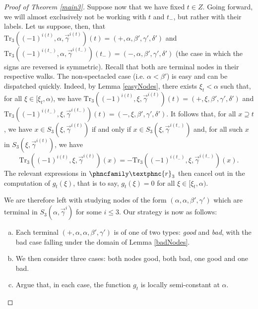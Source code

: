 \documentclass{amsart}
\numberwithin{theorem}{section}
\theoremstyle{definition}
\newcommand{\Tr}{\mathrm{Tr}}
\newcommand{\resh}{{\phncfamily\textphnc{r}}}
\begin{document}
\begin{proof}[Proof of Theorem \ref{main3}]
Suppose now that we have fixed $t\in Z$. Going forward, we will almost exclusively not be working with $t$ and $t_-$, but rather with their labels. Let us suppose, then, that 
$\Tr_3((-1)^{i(t)},\alpha,\vec{\gamma}^{i(t)})(t) = (+,\alpha,\beta',\gamma',\delta')$ and 
$\Tr_3((-1)^{i(t_-)},\alpha,\vec{\gamma}^{i(t_-)})(t_-) = (-,\alpha,\beta',\gamma',\delta')$ (the case 
in which the signs are reversed is symmetric). Recall that both are terminal nodes in their 
respective walks. The non-spectacled case (i.e. $\alpha<\beta'$) is easy and can be dispatched quickly. Indeed, by Lemma \ref{easyNodes}, there exists $\xi_t<\alpha$ such that, for all $\xi \in 
[\xi_t,\alpha)$, we have $\Tr_3((-1)^{i(t)},\xi,\vec{\gamma}^{i(t)})(t) = (+,\xi,\beta',\gamma',
\delta')$ and $\Tr_3((-1)^{i(t_-)},\xi,\vec{\gamma}^{i(t_-)})(t) = (-,\xi,\beta',\gamma',\delta')$. 
It follows that, for all $x \supseteq t$, we have $x \in S_3(\xi,\vec{\gamma}^{i(t)})$ if and only 
if $x \in S_3(\xi,\vec{\gamma}^{i(t_-)})$ and, for all such $x$ in $S_3(\xi,\vec{\gamma}^{i(t)})$, 
we have
\[
  \Tr_3((-1)^{i(t)},\xi,\vec{\gamma}^{i(t)})(x) = - \Tr_3((-1)^{i(t_-)},\xi,\vec{\gamma}^{i(t_-)})(x).
\]
The relevant expressions in $\resh_3$ then cancel out in the computation of $g_t(\xi)$, that is to say, $g_t(\xi)=0$ for all $\xi\in [\xi_t,\alpha)$.

We are therefore left with studying nodes of the form $(\alpha,\alpha,\beta',\gamma')$ which are terminal in $S_3(\alpha,\vec\gamma^i)$ for some $i\le 3$. Our strategy is now as follows:

\begin{enumerate}[(a)]
\item Each terminal $(+,\alpha,\alpha,\beta',\gamma')$ is of one of two types: \textit{good} and \textit{bad}, with the bad case falling under the domain of Lemma \ref{badNodes}.
\item We then consider three cases: both nodes good, both bad, one good and one bad.
\item Argue that, in each case, the function $g_t$ is locally semi-constant at $\alpha$.
\end{enumerate}


\end{proof}
\end{document}
